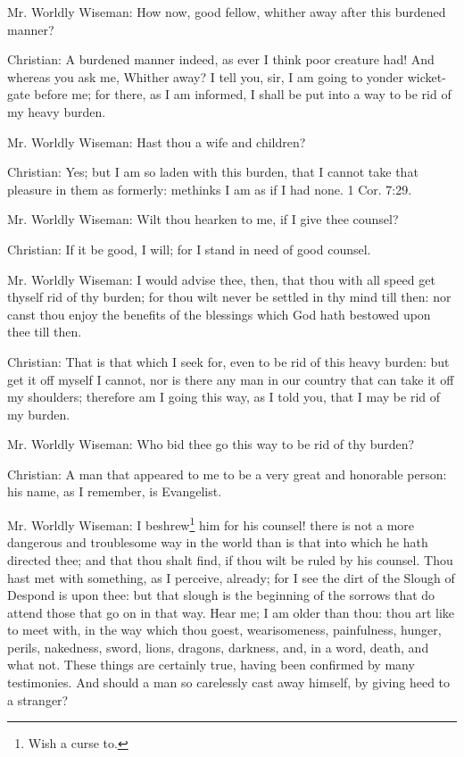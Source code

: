 Mr. Worldly Wiseman: How now, good fellow, whither away after this burdened manner? 

Christian: A burdened manner indeed, as ever I think poor creature had! And whereas you ask me, Whither away? I tell you, sir, I am going to yonder wicket-gate before me; for there, as I am informed, I shall be put into a way to be rid of my heavy burden. 

Mr. Worldly Wiseman: Hast thou a wife and children? 

Christian: Yes; but I am so laden with this burden, that I cannot take that pleasure in them as formerly: methinks I am as if I had none. 1 Cor. 7:29. 

Mr. Worldly Wiseman: Wilt thou hearken to me, if I give thee counsel? 

Christian: If it be good, I will; for I stand in need of good counsel. 

Mr. Worldly Wiseman: I would advise thee, then, that thou with all speed get thyself rid of thy burden; for thou wilt never be settled in thy mind till then: nor canst thou enjoy the benefits of the blessings which God hath bestowed upon thee till then. 

Christian: That is that which I seek for, even to be rid of this heavy burden: but get it off myself I cannot, nor is there any man in our country that can take it off my shoulders; therefore am I going this way, as I told you, that I may be rid of my burden. 

Mr. Worldly Wiseman: Who bid thee go this way to be rid of thy burden? 

Christian: A man that appeared to me to be a very great and honorable person: his name, as I remember, is Evangelist. 

Mr. Worldly Wiseman: I beshrew\footnote{Wish a curse to.} him for his counsel! there is not a more dangerous and troublesome way in the world than is that into which he hath directed thee; and that thou shalt find, if thou wilt be ruled by his counsel. Thou hast met with something, as I perceive, already; for I see the dirt of the Slough of Despond is upon thee: but that slough is the beginning of the sorrows that do attend those that go on in that way. Hear me; I am older than thou: thou art like to meet with, in the way which thou goest, wearisomeness, painfulness, hunger, perils, nakedness, sword, lions, dragons, darkness, and, in a word, death, and what not. These things are certainly true, having been confirmed by many testimonies. And should a man so carelessly cast away himself, by giving heed to a stranger? 

